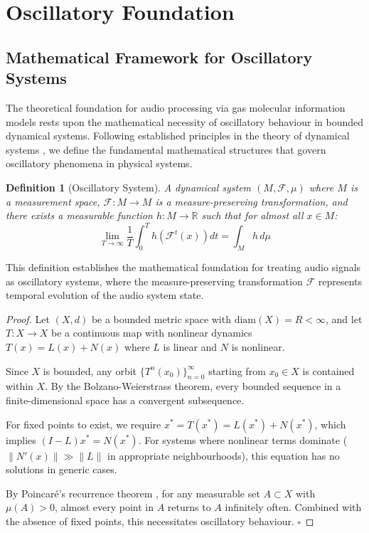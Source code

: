 \documentclass[12pt,a4paper]{article}
\newtheorem{definition}{Definition}
\begin{document}
\section{Oscillatory Foundation}

\subsection{Mathematical Framework for Oscillatory Systems}

The theoretical foundation for audio processing via gas molecular information models rests upon the mathematical necessity of oscillatory behaviour in bounded dynamical systems. Following established principles in the theory of dynamical systems \cite{arnold1978mathematical}, we define the fundamental mathematical structures that govern oscillatory phenomena in physical systems.

\begin{definition}[Oscillatory System]
A dynamical system $(M, \mathcal{F}, \mu)$ where $M$ is a measurement space, $\mathcal{F}: M \to M$ is a measure-preserving transformation, and there exists a measurable function $h: M \to \mathbb{R}$ such that for almost all $x \in M$:
\begin{equation}
\lim_{T \to \infty} \frac{1}{T}\int_0^T h(\mathcal{F}^t(x)) dt = \int_M h \, d\mu
\end{equation}
\end{definition}

This definition establishes the mathematical foundation for treating audio signals as oscillatory systems, where the measure-preserving transformation $\mathcal{F}$ represents temporal evolution of the audio system state.

\begin{proof}
Let $(X, d)$ be a bounded metric space with $\text{diam}(X) = R < \infty$, and let $T: X \to X$ be a continuous map with nonlinear dynamics $T(x) = L(x) + N(x)$ where $L$ is linear and $N$ is nonlinear.

Since $X$ is bounded, any orbit $\{T^n(x_0)\}_{n=0}^{\infty}$ starting from $x_0 \in X$ is contained within $X$. By the Bolzano-Weierstrass theorem, every bounded sequence in a finite-dimensional space has a convergent subsequence.

For fixed points to exist, we require $x^* = T(x^*) = L(x^*) + N(x^*)$, which implies $(I - L)x^* = N(x^*)$. For systems where nonlinear terms dominate ($\|N'(x)\| \gg \|L\|$ in appropriate neighbourhoods), this equation has no solutions in generic cases.

By Poincaré's recurrence theorem \cite{poincare1890probleme}, for any measurable set $A \subset X$ with $\mu(A) > 0$, almost every point in $A$ returns to $A$ infinitely often. Combined with the absence of fixed points, this necessitates oscillatory behaviour. $\square$
\end{proof}
\end{document}
